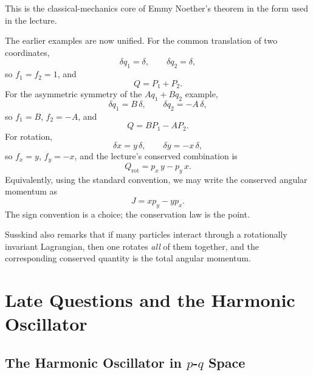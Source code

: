 This is the classical-mechanics core of Emmy Noether's theorem in the form used in the lecture.

The earlier examples are now unified. For the common translation of two coordinates,
\begin{equation}
\delta q_1=\delta,
\qquad
\delta q_2=\delta,
\end{equation}
so \(f_1=f_2=1\), and
\begin{equation}
Q=P_1+P_2.
\end{equation}
For the asymmetric symmetry of the \(Aq_1+Bq_2\) example,
\begin{equation}
\delta q_1=B\,\delta,
\qquad
\delta q_2=-A\,\delta,
\end{equation}
so \(f_1=B\), \(f_2=-A\), and
\begin{equation}
Q=BP_1-AP_2.
\end{equation}
For rotation,
\begin{equation}
\delta x=y\,\delta,
\qquad
\delta y=-x\,\delta,
\end{equation}
so \(f_x=y\), \(f_y=-x\), and the lecture's conserved combination is
\begin{equation}
Q_{\mathrm{rot}}=p_x\,y-p_y\,x.
\end{equation}
Equivalently, using the standard convention, we may write the conserved angular momentum as
\begin{equation}
J=xp_y-yp_x.
\end{equation}
The sign convention is a choice; the conservation law is the point.

Susskind also remarks that if many particles interact through a rotationally invariant Lagrangian, then one rotates \emph{all} of them together, and the corresponding conserved quantity is the total angular momentum.

\section{Late Questions and the Harmonic Oscillator}

\subsection{The Harmonic Oscillator in \(p\)-\(q\) Space}

